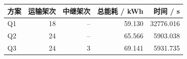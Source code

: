 \begin{tabular}{lrrrr}
\toprule
方案 & 运输架次 & 中继架次 & 总能耗 / kWh & 时间 / s \\
\midrule
Q1 & 18 & -- & 59.130 & 32776.016 \\
Q2 & 24 & -- & 65.566 & 5903.038 \\
Q3 & 24 & 3 & 69.141 & 5931.735 \\
\bottomrule
\end{tabular}
